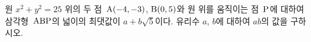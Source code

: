 원 $x^2+y^2=25$ 위의 두 점~$\mathrm{A}(-4{,}\mkern3mu\mathopen{}-3)$, $\mathrm{B}(0{,}\mkern3mu\mathopen{}5)$와 원 위를 움직이는 점~$\mathrm{P}$에 대하여 삼각형~$\mathrm{ABP}$의 넓이의 최댓값이 $a+b\sqrt{5}$이다. 유리수 $a$, $b$에 대하여 $ab$의 값을 구하시오.
